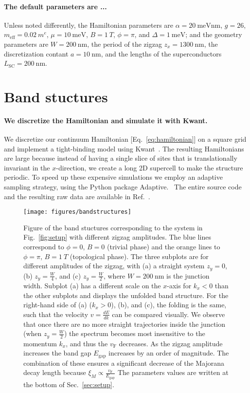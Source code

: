 \documentclass[english, twocolumn, 10pt, aps, superscriptaddress, floatfix, prb, citeautoscript]{revtex4-1}
\newcommand{\meff}{m_\text{eff}}
\renewcommand{\comment}[2]{#2}
\renewcommand{\comment}{\paragraph}
\begin{document}
\comment{The default parameters are ...}
Unless noted differently, the Hamiltonian parameters are $\alpha=\SI{20}{\meV \nm}$, $g=26$, $\meff=\SI{0.02}{\electronmass}$, $\mu=\SI{10}{\meV}$, $B=\SI{1}{T}$, $\phi=\pi$, and $\Delta=\SI{1}{\meV}$; and the geometry parameters are $W=\SI{200}{\nm}$, the period of the zigzag $z_x=\SI{1300}{\nm}$, the discretization contant $a=\SI{10}{\nm}$, and the lengths of the superconductors $L_\textrm{SC}=\SI{200}{\nm}$.  %

\section{Band stuctures}\label{sec:band_stuctures}

\comment{We discretize the Hamiltonian and simulate it with Kwant.}
We discretize our continuum Hamiltonian [Eq.~\eqref{eq:hamiltonian}] on a square grid and implement a tight-binding model using Kwant~\cite{groth_kwant:_2014}.
The resulting Hamiltonians are large because instead of having a single slice of sites that is translationally invariant in the $x$-direction, we create a long 2D supercell to make the structure periodic.
To speed up these expensive simulations we employ an adaptive sampling strategy, using the Python package Adaptive.~\cite{adaptive}
The entire source code and the resulting raw data are available in Ref.~.  %

\begin{figure}[!htb]
\texttt{[image: figures/bandstructures]}
\caption{Figure of the band stuctures corresponding to the system in Fig.~\ref{fig:setup} with different zigzag amplitudes.
The blue lines correspond to $\phi=0$, $B=0$ (trivial phase) and the orange lines to $\phi=\pi$, $B = \SI{1}{T}$ (topological phase).
The three subplots are for different amplitudes of the zigzag, with (a) a straight system $z_y=0$, (b) $z_y=\frac{W}{4}$, and (c) $z_y=\frac{W}{2}$, where $W=\SI{200}{\nm}$ is the junction width.
Subplot (a) has a different scale on the $x$-axis for $k_x < 0$ than the other subplots and displays the unfolded band structure.
For the right-hand side of (a) ($k_x > 0$), (b), and (c), the folding is the same, such that the velocity $v=\frac{dE}{dk}$ can be compared visually.
We observe that once there are no more straight trajectories inside the junction (when $z_y=\frac{W}{2}$) the spectrum becomes most insensitive to the momentum $k_x$, and thus the $v_\textrm{F}$ decreases.
As the zigzag amplitude increases the band gap $E_\textrm{gap}$ increases by an order of magnitude.
The combination of these ensures a significant decrease of the Majorana decay length because $\xi_M \propto \frac{v_\textrm{F}}{E_\textrm{gap}}$
The parameters values are written at the bottom of Sec.~\ref{sec:setup}.\label{fig:band_stuctures}}
\end{figure}
\end{document}
